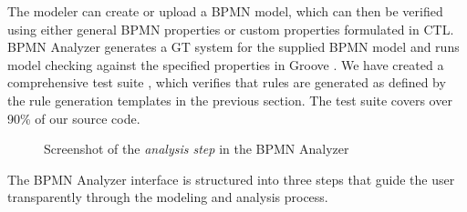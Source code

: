 \documentclass{lmcs} %
\begin{document}
The modeler can create or upload a BPMN model, which can then be verified using either general BPMN properties or custom properties formulated in CTL.
BPMN Analyzer generates a GT system for the supplied BPMN model and runs model checking against the specified properties in Groove \cite{kastenbergModelCheckingDynamic2006, rensinkExplicitStateModel2008}. 
We have created a comprehensive test suite \cite{timkrauterLMCS2024Artifacts2023}, which verifies that rules are generated as defined by the rule generation templates in the previous section.
The test suite covers over 90\% of our source code.

\begin{figure}[ht]
    \centering
    \caption{Screenshot of the \textit{analysis step} in the BPMN Analyzer}
    \label{fig:impl_step1}
\end{figure}

The BPMN Analyzer interface is structured into three steps that guide the user transparently through the modeling and analysis process.
\end{document}
